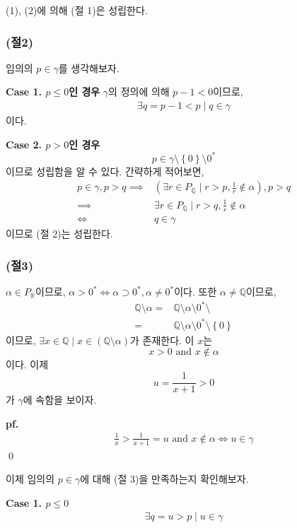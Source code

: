 \documentclass{article}
\begin{document}
(1), (2)에 의해 (절 1)은 성립한다.

\subsubsection{(절2)}
임의의 $p \in \gamma$를 생각해보자.

\textbf{Case 1. $p \le 0$인 경우}
$\gamma$의 정의에 의해 $p-1 < 0$이므로,
\begin{align*}
\exists q = p-1 < p \mid q \in \gamma
\end{align*}이다.

\textbf{Case 2. $p > 0$인 경우}
$$p \in \gamma \setminus \left\{0\right\} \setminus 0^*$$
이므로 성립함을 알 수 있다. 간략하게 적어보면,
\begin{align*}
p \in \gamma, p > q \implies & \left(\exists r \in P_{\mathbb{Q}} \mid r > p, \frac{1}{r} \notin \alpha \right), p > q
\\ \implies & \exists r \in P_{\mathbb{Q}} \mid r > q, \frac{1}{r} \notin \alpha
\\ \iff& q \in \gamma
\end{align*}이므로 (절 2)는 성립한다.

\subsubsection{(절3)}
$\alpha \in P_\mathbb{R}$이므로, $\alpha > 0^* \iff \alpha \supset 0^*, \alpha \neq 0^*$이다. 또한 $\alpha \neq \mathbb{Q}$이므로,
\begin{align*}
\mathbb{Q} \setminus \alpha =& \mathbb{Q} \setminus \alpha \setminus 0^* \setminus
\\ =& \mathbb{Q} \setminus \alpha \setminus 0^* \setminus \left\{0\right\} \tag{$0 \in \alpha$}
\end{align*}이므로, $\exists x \in \mathbb{Q} \mid x \in (\mathbb{Q} \setminus \alpha)$가 존재한다. 이 $x$는 
$$x > 0 \text{ and } x \notin \alpha$$이다. 이제 
$$u = \frac{1}{x+1} > 0$$가 $\gamma$에 속함을 보이자.

\textbf{pf.}
\begin{align*}
\frac{1}{x} > \frac{1}{x+1} = u \text{ and } x \notin \alpha \iff u \in \gamma \tag{1}
\end{align*}
 \qed

이제 임의의 $p \in \gamma$에 대해 (절 3)을 만족하는지 확인해보자.

\textbf{Case 1. $p \le 0$}
\begin{align*}
\exists q = u > p \mid u \in \gamma \tag{$\because$ (1)}
\end{align*}
 
\end{document}
